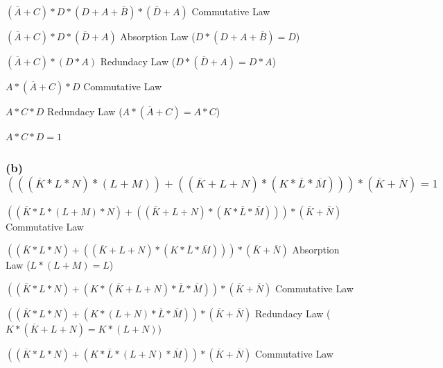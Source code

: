 \documentclass{article}
\newcommand{\boxedanswer}[1]{%

    \fbox{\large\textbf{#1}}%
}
\begin{document}
    $(\overline{A} + C) * D * (D + A + \overline{B}) * (\overline{D} + A)$ \hspace*{0.1in} Commutative Law

    $(\overline{A} + C) * D * (\overline{D} + A)$ \hspace*{0.1in} Absorption Law ($D * (D + A + \overline{B}) = D$)

    $(\overline{A} + C) * (D * A)$ \hspace*{0.1in} Redundacy Law ($D * (\overline{D} + A) = D * A$)

    $A * (\overline{A} + C) * D$ \hspace*{0.1in} Commutative Law

    $A * C * D$ \hspace*{0.1in} Redundacy Law ($A * (\overline{A} + C) = A * C$)

    $A * C * D = 1$

    \vspace*{0.1in}

    \boxedanswer{A = 1, C = 1, D = 1, B = 0 or 1}

    \subsubsection*{(b) $(((\overline{K} * L * N) * (L+M)) + ((\overline{K}+L+N) * (K*\overline{L}*\overline{M}))) * (\overline{K} + \overline{N}) = 1$}

    $((\overline{K} * L * (L+M) * N) + ((\overline{K}+L+N) * (K*\overline{L}*\overline{M}))) * (\overline{K} + \overline{N})$ \hspace*{0.1in} Commutative Law

    $((\overline{K} * L * N) + ((\overline{K}+L+N) * (K*\overline{L}*\overline{M}))) * (\overline{K} + \overline{N})$ \hspace*{0.1in} Absorption Law ($L * (L+M) = L$)

    $((\overline{K} * L * N) + (K * (\overline{K}+L+N) * \overline{L}*\overline{M})) * (\overline{K} + \overline{N})$ \hspace*{0.1in} Commutative Law

    $((\overline{K} * L * N) + (K * (L+N) * \overline{L}*\overline{M})) * (\overline{K} + \overline{N})$ \hspace*{0.1in} Redundacy Law ($K * (\overline{K}+L+N) = K*(L+N)$)

    $((\overline{K} * L * N) + (K * \overline{L} * (L+N)*\overline{M})) * (\overline{K} + \overline{N})$ \hspace*{0.1in} Commutative Law
\end{document}
